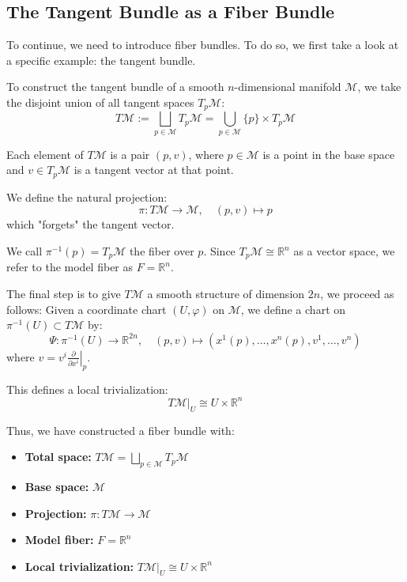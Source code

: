 \subsection*{The Tangent Bundle as a Fiber Bundle}

To continue, we need to introduce fiber bundles. To do so, we first take a look at a specific example: the tangent bundle.

To construct the tangent bundle of a smooth $n$-dimensional manifold $\mathcal{M}$, we take the disjoint union of all tangent spaces $T_p\mathcal{M}$:
\[
T\mathcal{M} := \bigsqcup_{p \in \mathcal{M}} T_p\mathcal{M}
= \bigcup_{p \in \mathcal{M}} \{p\} \times T_p\mathcal{M}
\]

Each element of $T\mathcal{M}$ is a pair $(p, v)$, where $p \in \mathcal{M}$ is a point in the base space and $v \in T_p\mathcal{M}$ is a tangent vector at that point.

We define the natural projection:
\[
\pi: T\mathcal{M} \to \mathcal{M}, \quad (p, v) \mapsto p
\]
which "forgets" the tangent vector.

We call $\pi^{-1}(p) = T_p\mathcal{M}$ the fiber over $p$. Since $T_p\mathcal{M} \cong \mathbb{R}^n$ as a vector space, we refer to the model fiber as $F = \mathbb{R}^n$.

The final step is to give $T\mathcal{M}$ a smooth structure of dimension $2n$, we proceed as follows:  
Given a coordinate chart $(U, \varphi)$ on $\mathcal{M}$, we define a chart on $\pi^{-1}(U) \subset T\mathcal{M}$ by:
\[
\Psi: \pi^{-1}(U) \to \mathbb{R}^{2n}, \quad (p, v) \mapsto \left(x^1(p), \dots, x^n(p), v^1, \dots, v^n \right)
\]
where $v = v^i \left. \frac{\partial}{\partial x^i} \right|_p$.

This defines a local trivialization:
\[
T\mathcal{M}|_U \cong U \times \mathbb{R}^n
\]

Thus, we have constructed a fiber bundle with:
\begin{itemize}
  \item \textbf{Total space:} $T\mathcal{M} = \bigsqcup_{p \in \mathcal{M}} T_p\mathcal{M}$
  \item \textbf{Base space:} $\mathcal{M}$
  \item \textbf{Projection:} $\pi: T\mathcal{M} \to \mathcal{M}$
  \item \textbf{Model fiber:} $F = \mathbb{R}^n$
  \item \textbf{Local trivialization:} $T\mathcal{M}|_U \cong U \times \mathbb{R}^n$
\end{itemize}

